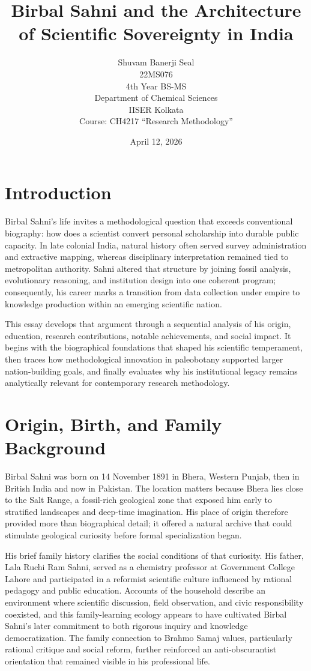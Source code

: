 \documentclass[10pt]{article}
\title{Birbal Sahni and the Architecture of Scientific Sovereignty in India}
\author{Shuvam Banerji Seal\\
22MS076\\
4th Year BS-MS\\
Department of Chemical Sciences\\
IISER Kolkata\\
Course: CH4217 ``Research Methodology''}
\date{April 12, 2026}
\begin{document}
\maketitle

\section*{Introduction}
Birbal Sahni's life invites a methodological question that exceeds conventional biography: how does a scientist convert personal scholarship into durable public capacity. In late colonial India, natural history often served survey administration and extractive mapping, whereas disciplinary interpretation remained tied to metropolitan authority. Sahni altered that structure by joining fossil analysis, evolutionary reasoning, and institution design into one coherent program; consequently, his career marks a transition from data collection under empire to knowledge production within an emerging scientific nation.\cite{wiki_birbal,ias_memorial,palaeobot_bio,science_state_nation}

This essay develops that argument through a sequential analysis of his origin, education, research contributions, notable achievements, and social impact. It begins with the biographical foundations that shaped his scientific temperament, then traces how methodological innovation in paleobotany supported larger nation-building goals, and finally evaluates why his institutional legacy remains analytically relevant for contemporary research methodology.\cite{from_lahore_lucknow,bsip_history,jstor_obit}

\section*{Origin, Birth, and Family Background}
Birbal Sahni was born on 14 November 1891 in Bhera, Western Punjab, then in British India and now in Pakistan. The location matters because Bhera lies close to the Salt Range, a fossil-rich geological zone that exposed him early to stratified landscapes and deep-time imagination. His place of origin therefore provided more than biographical detail; it offered a natural archive that could stimulate geological curiosity before formal specialization began.\cite{wiki_birbal,ias_memorial,from_lahore_lucknow}

His brief family history clarifies the social conditions of that curiosity. His father, Lala Ruchi Ram Sahni, served as a chemistry professor at Government College Lahore and participated in a reformist scientific culture influenced by rational pedagogy and public education. Accounts of the household describe an environment where scientific discussion, field observation, and civic responsibility coexisted, and this family-learning ecology appears to have cultivated Birbal Sahni's later commitment to both rigorous inquiry and knowledge democratization. The family connection to Brahmo Samaj values, particularly rational critique and social reform, further reinforced an anti-obscurantist orientation that remained visible in his professional life.\cite{punjab_science,ruchi_ram,wiki_birbal}
\end{document}
